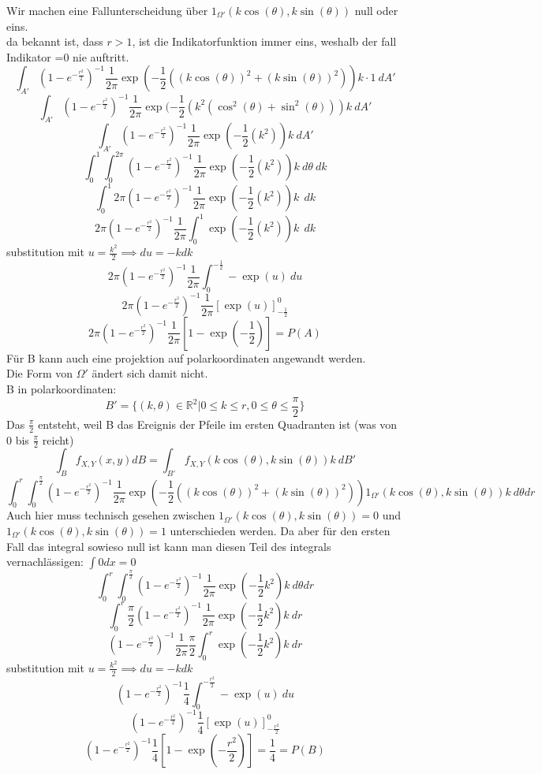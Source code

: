 \documentclass{article}
\begin{document}
	Wir machen eine Fallunterscheidung über $1_{\Omega'}(k\cos(\theta),k\sin(\theta))$ null oder eins.\\
	da bekannt ist, dass $r>1$, ist die Indikatorfunktion immer eins, weshalb der fall Indikator =0 nie auftritt.\\
	$$\int_{A'} (1-e^{-\frac{r^2}{2}})^{-1} \frac{1}{2\pi}\exp(-\frac{1}{2}((k\cos(\theta))^2+(k\sin(\theta))^2))k\cdot 1\ dA'$$
	$$\int_{A'} (1-e^{-\frac{r^2}{2}})^{-1} \frac{1}{2\pi}\exp(-\frac{1}{2}(k^2(\cos^2(\theta)+\sin^2(\theta)))k\ dA'$$
	$$\int_{A'} (1-e^{-\frac{r^2}{2}})^{-1} \frac{1}{2\pi}\exp(-\frac{1}{2}(k^2))k\ dA'$$
	$$\int_0^1\int_0^{2\pi} (1-e^{-\frac{r^2}{2}})^{-1} \frac{1}{2\pi}\exp(-\frac{1}{2}(k^2))k\ d\theta\ dk$$
	$$\int_0^1 2\pi (1-e^{-\frac{r^2}{2}})^{-1} \frac{1}{2\pi}\exp(-\frac{1}{2}(k^2))k\ \ dk$$
	$$2\pi (1-e^{-\frac{r^2}{2}})^{-1} \frac{1}{2\pi}\int_0^1 \exp(-\frac{1}{2}(k^2))k\ \ dk$$
	substitution mit $u=\frac{k^2}{2}\implies du = -kdk$\\
	$$2\pi (1-e^{-\frac{r^2}{2}})^{-1} \frac{1}{2\pi}\int_0^{-\frac{1}{2}} -\exp(u)\ du$$
	$$2\pi (1-e^{-\frac{r^2}{2}})^{-1} \frac{1}{2\pi}[ \exp(u)]_{-\frac{1}{2}}^0$$
	$$2\pi (1-e^{-\frac{r^2}{2}})^{-1} \frac{1}{2\pi}[ 1-\exp(-\frac{1}{2})] =P(A)$$
	Für B kann auch eine projektion auf polarkoordinaten angewandt werden.\\
	Die Form von $\Omega'$ ändert sich damit nicht.\\
	B in polarkoordinaten:\\
	$$B' = \{(k,\theta)\in\mathbb{R}^2| 0\leq k\leq r, 0\leq \theta\leq \frac{\pi}{2} \}$$
	Das $\frac{\pi}{2}$ entsteht, weil B das Ereignis der Pfeile im ersten Quadranten ist (was von $0$ bis $\frac{\pi}{2}$ reicht)\\
	$$\int_B  f_{X,Y}(x,y) dB = \int_{B'} f_{X,Y}(k\cos(\theta), k\sin(\theta))k\ dB'$$
	$$\int_0^r\int_0^\frac{\pi}{2} (1-e^{-\frac{r^2}{2}})^{-1} \frac{1}{2\pi}\exp(-\frac{1}{2}((k\cos(\theta))^2+(k\sin(\theta))^2))1_{\Omega'}(k\cos(\theta),k\sin(\theta))k\ d\theta dr $$
	Auch hier muss technisch gesehen zwischen $1_{\Omega'}(k\cos(\theta),k\sin(\theta)) =0$ und $1_{\Omega'}(k\cos(\theta),k\sin(\theta))=1$ unterschieden werden. Da aber für den ersten Fall das integral sowieso null ist kann  man diesen Teil des integrals vernachlässigen: $\int 0 dx = 0$\\
	$$\int_0^r\int_0^\frac{\pi}{2} (1-e^{-\frac{r^2}{2}})^{-1} \frac{1}{2\pi}\exp(-\frac{1}{2}k^2)k\ d\theta dr $$
	$$\int_0^r\frac{\pi}{2} (1-e^{-\frac{r^2}{2}})^{-1} \frac{1}{2\pi}\exp(-\frac{1}{2}k^2)k\ dr $$
	$$(1-e^{-\frac{r^2}{2}})^{-1} \frac{1}{2\pi}\frac{\pi}{2}\int_0^r \exp(-\frac{1}{2}k^2)k\ dr $$
	substitution mit $u=\frac{k^2}{2}\implies du = -kdk$\\
	$$(1-e^{-\frac{r^2}{2}})^{-1} \frac{1}{4}\int_0^{-\frac{r^2}{2}} -\exp(u)\ du$$
	$$(1-e^{-\frac{r^2}{2}})^{-1} \frac{1}{4}[ \exp(u)]^0_{-\frac{r^2}{2}}$$
	$$(1-e^{-\frac{r^2}{2}})^{-1} \frac{1}{4}[1- \exp({-\frac{r^2}{2}})] = \frac{1}{4}=P(B)$$
\end{document}
